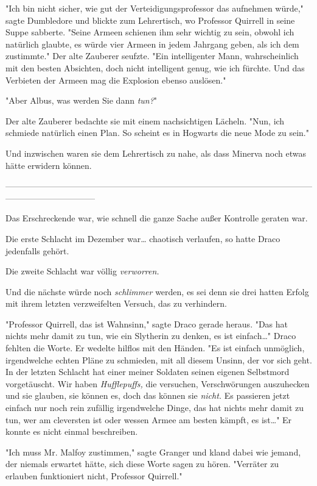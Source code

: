 {"Ich bin nicht sicher, wie gut der Verteidigungsprofessor das aufnehmen würde," sagte Dumbledore und blickte zum Lehrertisch, wo Professor Quirrell in seine Suppe sabberte. "Seine Armeen schienen ihm sehr wichtig zu sein, obwohl ich natürlich glaubte, es würde vier Armeen in jedem Jahrgang geben, als ich dem zustimmte." Der alte Zauberer seufzte. "Ein intelligenter Mann, wahrscheinlich mit den besten Absichten, doch nicht intelligent genug, wie ich fürchte. Und das Verbieten der Armeen mag die Explosion ebenso auslösen."

"Aber Albus, was werden Sie dann \emph{tun?}"

Der alte Zauberer bedachte sie mit einem nachsichtigen Lächeln. "Nun, ich schmiede natürlich einen Plan. So scheint es in Hogwarts die neue Mode zu sein."

Und inzwischen waren sie dem Lehrertisch zu nahe, als dass Minerva noch etwas hätte erwidern können.

--------------------------------------------------------------------------------------------------------------------------------------------

Das Erschreckende war, wie schnell die ganze Sache außer Kontrolle geraten war.

Die erste Schlacht im Dezember war… chaotisch verlaufen, so hatte Draco jedenfalls gehört.

Die zweite Schlacht war völlig \emph{verworren.}

Und die nächste würde noch \emph{schlimmer} werden, es sei denn sie drei hatten Erfolg mit ihrem letzten verzweifelten Versuch, das zu verhindern.

"Professor Quirrell, das ist Wahnsinn," sagte Draco gerade heraus. "Das hat nichts mehr damit zu tun, wie ein Slytherin zu denken, es ist einfach…" Draco fehlten die Worte. Er wedelte hilflos mit den Händen. "Es ist einfach unmöglich, irgendwelche echten Pläne zu schmieden, mit all diesem Unsinn, der vor sich geht. In der letzten Schlacht hat einer meiner Soldaten seinen eigenen Selbstmord vorgetäuscht. Wir haben \emph{Hufflepuffs,} die versuchen, Verschwörungen auszuhecken und sie glauben, sie können es, doch das können sie \emph{nicht.} Es passieren jetzt einfach nur noch rein zufällig irgendwelche Dinge, das hat nichts mehr damit zu tun, wer am cleversten ist oder wessen Armee am besten kämpft, es ist…" Er konnte es nicht einmal beschreiben.

"Ich muss Mr. Malfoy zustimmen," sagte Granger und kland dabei wie jemand, der niemals erwartet hätte, sich diese Worte sagen zu hören. "Verräter zu erlauben funktioniert nicht, Professor Quirrell."

}
